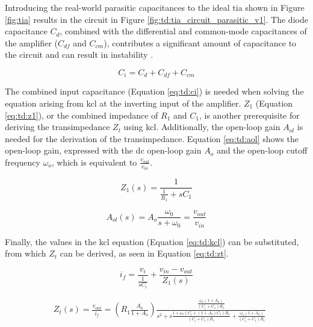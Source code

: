 Introducing the real-world parasitic capacitances to the ideal \gls{tia} shown in Figure \ref{fig:tia} results in the circuit in Figure \ref{fig:td:tia_circuit_parasitic_v1}. The diode capacitance $C_d$, combined with the differential and common-mode capacitances of the amplifier ($C_{df}$ and $C_{cm}$), contributes a significant amount of capacitance to the circuit and can result in instability \cite{cherian2016you}.

\begin{equation}\label{eq:td:ci}
	C_i = C_{d} + C_{df} + C_{cm}
\end{equation}

The combined input capacitance (Equation \eqref{eq:td:ci}) is needed when solving the equation arising from \gls{kcl} at the inverting input of the amplifier. $Z_1$ (Equation \eqref{eq:td:z1}), or the combined impedance of $R_1$ and $C_1$, is another prerequisite for deriving the transimpedance $Z_t$ using \gls{kcl}. Additionally, the open-loop gain $A_{ol}$ is needed for the derivation of the transimpedance. Equation \eqref{eq:td:aol} shows the open-loop gain, expressed with the \gls{dc} open-loop gain $A_o$ and the open-loop cutoff frequency $\omega_o$, which is equivalent to $\frac{v_{out}}{v_{in}}$.

\begin{equation}\label{eq:td:z1}
	Z_1(s) = \frac{1}{\frac{1}{R_1} + sC_1}
\end{equation}

\begin{equation}\label{eq:td:aol}
	A_{ol}(s) = A_o\frac{\omega_0}{s + \omega_0} = \frac{v_{out}}{v_{in}}
\end{equation}

Finally, the values in the \gls{kcl} equation (Equation \eqref{eq:td:kcl}) can be substituted, from which $Z_t$ can be derived, as seen in Equation \eqref{eq:td:zt}. 

\begin{equation}\label{eq:td:kcl}
	i_f = \frac{v_i}{\frac{1}{sC_i}} + \frac{v_{in} - v_{out}}{Z_1(s)}
\end{equation}

\begin{equation}\label{eq:td:zt}
	\begin{aligned}
	&Z_t(s) = \frac{v_{out}}{i_f} = (R_1\frac{A_o}{1 + A_o})\frac{\frac{\omega_o(1 + A_o)}{(C_i + C_1)R_1}}{s^2 + s\frac{1 + \omega_o(C_i + (1 + A_o)C_1)R_1}{(C_i + C_1)R_1} + \frac{\omega_o(1 + A_o)}{(C_i + C_1)R_1}}
	\end{aligned}
\end{equation}

